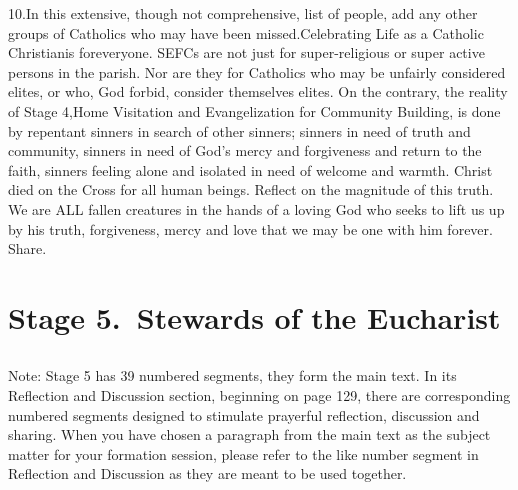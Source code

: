 \documentclass[oneside]{book}
\begin{document}
10.In this extensive, though not comprehensive, list of people, add any other
groups of Catholics who may have been missed.Celebrating Life as a Catholic
Christianis foreveryone. SEFCs are not just for super-religious or super active
persons in the parish. Nor are they for Catholics who may be unfairly considered
elites, or who, God forbid, consider themselves elites.
On the contrary, the reality of Stage 4,Home Visitation and Evangelization for
Community Building, is done by repentant sinners in search of other sinners;
sinners in need of truth and community, sinners in need of God's mercy and
forgiveness and return to the faith, sinners feeling alone and isolated in need
of welcome and warmth. Christ died on the Cross for all human beings. Reflect on
the magnitude of this truth. We are ALL fallen creatures in the hands of a
loving God who seeks to lift us up by his truth, forgiveness, mercy and love
that we may be one with him forever. Share.


\chapter{Stage 5.\ Stewards of the Eucharist}

\section*{} 

Note: Stage 5 has 39 numbered segments, they form the main text. In its
Reflection and Discussion section, beginning on page 129, there are
corresponding numbered segments designed to stimulate prayerful reflection,
discussion and sharing. When you have chosen a paragraph from the main text as
the subject matter for your formation session, please refer to the like number
segment in Reflection and Discussion as they are meant to be used together.
\end{document}
